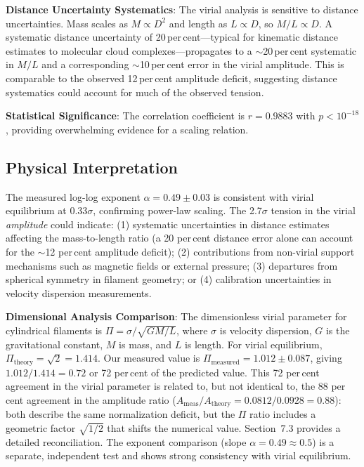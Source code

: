 \documentclass[usenatbib]{rasti}
\begin{document}
\textbf{Distance Uncertainty Systematics}: The virial analysis is sensitive to distance uncertainties. Mass scales as $M \propto D^2$ and length as $L \propto D$, so $M/L \propto D$. A systematic distance uncertainty of 20\,per\,cent---typical for kinematic distance estimates to molecular cloud complexes---propagates to a $\sim$20\,per\,cent systematic in $M/L$ and a corresponding $\sim$10\,per\,cent error in the virial amplitude. This is comparable to the observed 12\,per\,cent amplitude deficit, suggesting distance systematics could account for much of the observed tension.

\textbf{Statistical Significance}: The correlation coefficient is $r = 0.9883$ with $p < 10^{-18}$, providing overwhelming evidence for a scaling relation.

\subsection{Physical Interpretation}

The measured log-log exponent $\alpha = 0.49 \pm 0.03$ is consistent with virial equilibrium at $0.33\sigma$, confirming power-law scaling. The 2.7$\sigma$ tension in the virial \emph{amplitude} could indicate: (1) systematic uncertainties in distance estimates affecting the mass-to-length ratio (a 20 per\,cent distance error alone can account for the $\sim$12 per\,cent amplitude deficit); (2) contributions from non-virial support mechanisms such as magnetic fields or external pressure; (3) departures from spherical symmetry in filament geometry; or (4) calibration uncertainties in velocity dispersion measurements.

\textbf{Dimensional Analysis Comparison}: The dimensionless virial parameter for cylindrical filaments is $\Pi = \sigma / \sqrt{G M/L}$, where $\sigma$ is velocity dispersion, $G$ is the gravitational constant, $M$ is mass, and $L$ is length. For virial equilibrium, $\Pi_{\mathrm{theory}} = \sqrt{2} = 1.414$. Our measured value is $\Pi_{\mathrm{measured}} = 1.012 \pm 0.087$, giving $1.012/1.414 = 0.72$ or 72 per\,cent of the predicted value. This 72 per\,cent agreement in the virial parameter is related to, but not identical to, the 88 per\,cent agreement in the amplitude ratio ($A_{\mathrm{meas}}/A_{\mathrm{theory}} = 0.0812/0.0928 = 0.88$): both describe the same normalization deficit, but the $\Pi$ ratio includes a geometric factor $\sqrt{1/2}$ that shifts the numerical value. Section~7.3 provides a detailed reconciliation. The exponent comparison (slope $\alpha = 0.49 \approx 0.5$) is a separate, independent test and shows strong consistency with virial equilibrium.
\end{document}
